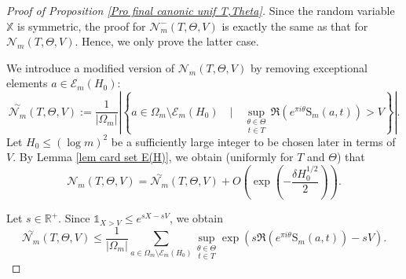 \documentclass[12pt]{amsart}
\theoremstyle{definition}
\numberwithin{equation}{section}
\numberwithin{equation}{section}
\def\Ecal{\mathcal{E}}
\def\Ncal{\mathcal{N}}
\def\R{\mathbb{R}}
\def\B{\mathrm{S}}
\def\X{\mathbb{X}}
\def\un{\mathds{1}}
\begin{document}
\begin{proof}[Proof of Proposition \ref{Pro final canonic unif T,Theta}] Since the random variable \(\X\) is symmetric, the proof for \(\Ncal_m^-(T,\Theta,V)\) is exactly the same as that for \(\Ncal_m(T,\Theta,V)\). Hence, we only prove the latter case.

We introduce a modified version of $\Ncal_m(T,\Theta,V)$ by removing exceptional elements $a\in\Ecal_m(H_0):$
\[
\overset{\sim}{\Ncal_m}(T,\Theta, V) := \frac{1}{|\Omega_m|}\left|\left\{
a\in \Omega_m\setminus \Ecal_m(H_0) \quad \big|\quad
\underset{t\in T}{\sup_{\theta\in\Theta}}\,
\Re\left(e^{\pi i\theta}\B_m(a,t)\right)> V
\right\}\right|.
\]
Let \(H_0\leq (\log m)^2\) be a sufficiently large integer to be chosen later in terms of $V$. By Lemma \ref{lem card set E(H)}, we obtain (uniformly for $T$ and $\Theta$) that
\begin{equation}\label{eq Ncal_m = 
sim Ncal_m}
\Ncal_m(T,\Theta, V) = 
\overset{\sim}{\Ncal_m}(T,\Theta, V)+O\left(
\exp\left(-\frac{\delta H_0^{1/2}}{2}\right)\right).
\end{equation}

Let $s\in \R^+ $. Since $\un_{X>V}\leq e^{sX-sV}$, we obtain
\[
\overset{\sim}{\Ncal_m}(T,\Theta, V)
\leq \frac{1}{|\Omega_m|}\sum_{a\in \Omega_m\setminus \Ecal_m(H_0)}
\underset{t\in T}{\sup_{\theta\in\Theta}}
\exp\left(
s \Re\left(e^{\pi i\theta}\B_m(a,t)\right) -sV
\right).
\]


\end{proof}
\end{document}
